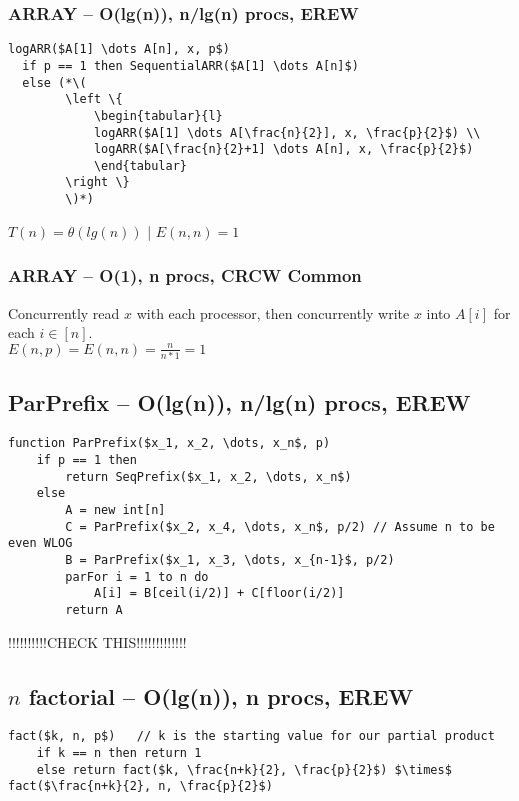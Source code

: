 \documentclass[12pt]{article}
\begin{document}
\subsubsection{ARRAY -- O(lg(n)), n/lg(n) procs, EREW}
\begin{lstlisting}
logARR($A[1] \dots A[n], x, p$)
  if p == 1 then SequentialARR($A[1] \dots A[n]$)
  else (*\(
        \left \{
            \begin{tabular}{l}
            logARR($A[1] \dots A[\frac{n}{2}], x, \frac{p}{2}$) \\
            logARR($A[\frac{n}{2}+1] \dots A[n], x, \frac{p}{2}$)
            \end{tabular}
        \right \}
        \)*)
\end{lstlisting}
$T(n) = \theta(lg(n))$ | $E(n,n) = 1$
\subsubsection{ARRAY -- O(1), n procs, CRCW Common}
Concurrently read $x$ with each processor, then concurrently write $x$ into $A[i]$ for each $i \in [n]$.\\
$E(n,p) = E(n,n) = \frac{n}{n*1} = 1$


\subsection{ParPrefix -- O(lg(n)), n/lg(n) procs, EREW}
\begin{lstlisting}
function ParPrefix($x_1, x_2, \dots, x_n$, p)
    if p == 1 then
        return SeqPrefix($x_1, x_2, \dots, x_n$)
    else
        A = new int[n]
        C = ParPrefix($x_2, x_4, \dots, x_n$, p/2) // Assume n to be even WLOG
        B = ParPrefix($x_1, x_3, \dots, x_{n-1}$, p/2)
        parFor i = 1 to n do
            A[i] = B[ceil(i/2)] + C[floor(i/2)]
        return A
\end{lstlisting}
!!!!!!!!!!CHECK THIS!!!!!!!!!!!!!


\subsection{$n$ factorial -- O(lg(n)), n procs, EREW}
\begin{lstlisting}
fact($k, n, p$)   // k is the starting value for our partial product
    if k == n then return 1
    else return fact($k, \frac{n+k}{2}, \frac{p}{2}$) $\times$ fact($\frac{n+k}{2}, n, \frac{p}{2}$)
\end{lstlisting}
\end{document}
